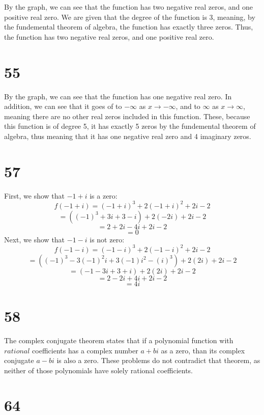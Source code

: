 \documentclass{article}
\theoremstyle{definition}
\begin{document}
By the graph, we can see that the function has two negative real zeros, and one positive real zero. 
We are given that the degree of the function is 3, meaning, 
by the fundemental theorem of algebra, the function has exactly three zeros. Thus, the function has two negative real zeros, and one positive real zero.

\section*{55}


By the graph, we can see that the function has one negative real zero. In addition, we can see that it goes of to $-\infty$ as $x\rightarrow -\infty$, 
and to $\infty$ as $x\rightarrow \infty$, meaning there are no other real zeros included in this function. These, because this function is of degree 
5, it has exactly 5 zeros by the fundemental theorem of algebra, thus meaning that it has one negative real zero and 4 imaginary zeros.

\section*{57}

First, we show that $-1+i$ is a zero:
\[ f(-1+i)=(-1+i)^3+2(-1+i)^2+2i-2 \]
\[ =((-1)^3+3i+3-i)+2(-2i)+2i-2 \]
\[ =2+2i-4i+2i-2 \]
\[ =0 \]
Next, we show that $-1-i$ is not zero:
\[ f(-1-i)=(-1-i)^3+2(-1-i)^2+2i-2 \]
\[ =((-1)^3-3(-1)^2i+3(-1)i^2-(i)^3)+2(2i)+2i-2 \]
\[ =(-1-3i+3+i)+2(2i)+2i-2 \]
\[ =2-2i+4i+2i-2 \]
\[ =4i \]

\section*{58}


The complex conjugate theorem states that if a polynomial function with $rational$ coefficients has a complex number $a+bi$ as a zero, than its complex 
conjugate $a-bi$ is also a zero. These problems do not contradict that theorem, as neither of those polynomials have solely rational coefficients.	

\section*{64}
\end{document}
